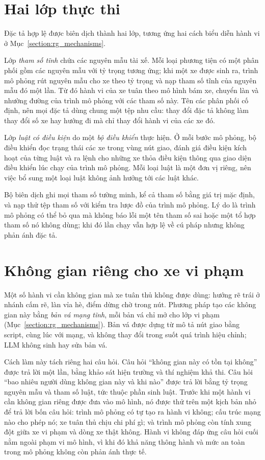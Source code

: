 \documentclass[../main.tex]{subfiles}
\begin{document}
\section{Hai lớp thực thi}
\label{section:ex_layers}

Đặc tả hợp lệ được biên dịch thành hai lớp, tương ứng hai cách biểu diễn hành vi ở Mục~\ref{section:rg_mechanisms}.

Lớp \emph{tham số tĩnh} chứa các nguyên mẫu tài xế. Mỗi loại phương tiện có một phân phối gồm các nguyên mẫu với tỷ trọng tương ứng; khi một xe được sinh ra, trình mô phỏng rút nguyên mẫu cho xe theo tỷ trọng và nạp tham số tĩnh của nguyên mẫu đó một lần. Từ đó hành vi của xe tuân theo mô hình bám xe, chuyển làn và nhường đường của trình mô phỏng với các tham số này. Tên các phân phối cố định, nên mọi đặc tả dùng chung một tệp nhu cầu: thay đổi đặc tả không làm thay đổi số xe hay hướng đi mà chỉ thay đổi hành vi của các xe đó.

Lớp \emph{luật có điều kiện} do một \emph{bộ điều khiển} thực hiện. Ở mỗi bước mô phỏng, bộ điều khiển đọc trạng thái các xe trong vùng nút giao, đánh giá điều kiện kích hoạt của từng luật và ra lệnh cho những xe thỏa điều kiện thông qua giao diện điều khiển lúc chạy của trình mô phỏng. Mỗi loại luật là một đơn vị riêng, nên việc bổ sung một loại luật không ảnh hưởng tới các luật khác.

Bộ biên dịch ghi mọi tham số tường minh, kể cả tham số bằng giá trị mặc định, và nạp thử tệp tham số với kiểm tra lược đồ của trình mô phỏng. Lý do là trình mô phỏng có thể bỏ qua mà không báo lỗi một tên tham số sai hoặc một tổ hợp tham số nó không dùng; khi đó lần chạy vẫn hợp lệ về cú pháp nhưng không phản ánh đặc tả.

\section{Không gian riêng cho xe vi phạm}
\label{section:ex_space}

Một số hành vi cần không gian mà xe tuân thủ không được dùng: hướng rẽ trái ở nhánh cấm rẽ, làn vỉa hè, điểm dừng chờ trong nút. Phương pháp tạo các không gian này bằng \emph{bản vá mạng tĩnh}, mỗi bản vá chỉ mở cho lớp vi phạm (Mục~\ref{section:rg_mechanisms}). Bản vá được dựng từ mô tả nút giao bằng script, cùng lúc với mạng, và không thay đổi trong suốt quá trình hiệu chỉnh; LLM không sinh hay sửa bản vá.

Cách làm này tách riêng hai câu hỏi. Câu hỏi ``không gian này có tồn tại không'' được trả lời một lần, bằng khảo sát hiện trường và thí nghiệm khả thi. Câu hỏi ``bao nhiêu người dùng không gian này và khi nào'' được trả lời bằng tỷ trọng nguyên mẫu và tham số luật, tức thuộc phần sinh luật. Trước khi một hành vi cần không gian riêng được đưa vào mô hình, nó được thử trên một kịch bản nhỏ để trả lời bốn câu hỏi: trình mô phỏng có tự tạo ra hành vi không; cấu trúc mạng nào cho phép nó; xe tuân thủ chịu chi phí gì; và trình mô phỏng còn tính xung đột giữa xe vi phạm và dòng xe thật không. Hành vi không đáp ứng câu hỏi cuối nằm ngoài phạm vi mô hình, vì khi đó khả năng thông hành và mức an toàn trong mô phỏng không còn phản ánh thực tế.
\end{document}
